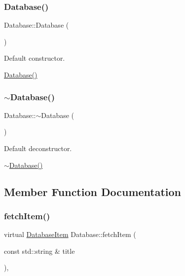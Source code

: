 \subsubsection{\texorpdfstring{Database()}{Database()}}
{\footnotesize\ttfamily Database\+::\+Database (\begin{DoxyParamCaption}{ }\end{DoxyParamCaption})\hspace{0.3cm}{\ttfamily [inline]}}



Default constructor. 

\hyperlink{classDatabase_a4703c80e6969d33565ea340f768fdadf}{Database()} \mbox{\label{classDatabase_a341cd0fe8c615e829e3a22b74c208bb5}} 
\subsubsection{\texorpdfstring{$\sim$\+Database()}{~Database()}}
{\footnotesize\ttfamily Database\+::$\sim$\+Database (\begin{DoxyParamCaption}{ }\end{DoxyParamCaption})\hspace{0.3cm}{\ttfamily [default]}}



Default deconstructor. 

\hyperlink{classDatabase_a341cd0fe8c615e829e3a22b74c208bb5}{$\sim$\+Database()} 

\subsection{Member Function Documentation}
\mbox{\label{classDatabase_a40254eec69c7d7cc15da24a9f0b072b3}} 
\subsubsection{\texorpdfstring{fetch\+Item()}{fetchItem()}}
{\footnotesize\ttfamily virtual \hyperlink{classDatabaseItem}{Database\+Item} Database\+::fetch\+Item (\begin{DoxyParamCaption}\item[{const std\+::string \&}]{title }\end{DoxyParamCaption})\hspace{0.3cm}{\ttfamily [inline]}, {\ttfamily [virtual]}}



